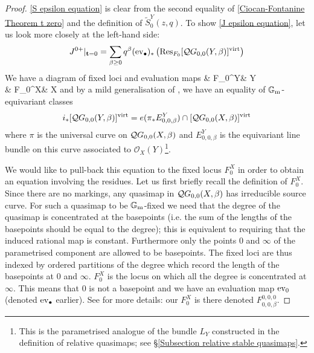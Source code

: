 \begin{proof}
\eqref{S epsilon equation} is clear from the second equality of \eqref{Ciocan-Fontanine Theorem t zero} and the definition of $\tilde{S}^Y_0(z,q)$. To show  \eqref{J epsilon equation}, let us look more closely at the left-hand side:
\begin{equation*} {J^{0+}}|_{{\mathbf{t}=0}} = \sum_{\beta\geq 0}q^\beta(\operatorname{ev}_\bullet)_* \left( \operatorname{Res}_{F_0}[\mathcal{Q}G_{0,0}(Y,\beta)]^{\operatorname{virt}} \right) \end{equation*}
We have a diagram of fixed loci and evaluation maps
\bcd
{}\ar[d,hook,"i"] & F_0^Y\ar[d, hook, "i"]\ar[l,hook']\ar[r,"\ev_{\bullet}"] & Y\ar[d,hook,"i"] \\
 & F_0^X\ar[l,hook']\ar[r,"\ev_{\bullet}"] & X
\ecd
and by a mild generalisation of \cite[Propositions 6.2.2 and 6.2.3]{CFKM}, we have an equality of $\mathbb{G}_{\text{m}}$-equivariant classes
\begin{equation*} i_*[\mathcal{Q}G_{0,0}(Y,\beta)]^{\operatorname{virt}}=e(\pi_* E^Y_{0,0,\beta})\cap [\mathcal{Q}G_{0,0}(X,\beta)]^{\operatorname{virt}} \end{equation*} 
where $\pi$ is the universal curve on $\mathcal{Q}G_{0,0}(X,\beta)$ and $E^Y_{0,0,\beta}$ is the equivariant line bundle on this curve associated to $\mathcal O_X(Y)$\footnote{This is the parametrised analogue of the bundle $L_Y$ constructed in the definition of relative quasimaps; see \S \ref{Subsection relative stable quasimaps}.}.
 
We would like to pull-back this equation to the fixed locus $F_0^X$ in order to obtain an equation involving the residues. Let us first briefly recall the definition of $F_0^X$. Since there are no markings, any quasimap in $\mathcal{Q}G_{0,0}(X,\beta)$ has irreducible source curve. For such a quasimap to be $\mathbb{G}_{\text{m}}$-fixed we need that the degree of the quasimap is concentrated at the basepoints (i.e. the sum of the lengths of the basepoints should be equal to the degree); this is equivalent to requiring that the induced rational map is constant. Furthermore only the points $0$ and $\infty$ of the parametrised component are allowed to be basepoints. The fixed loci are thus indexed by ordered partitions of the degree which record the length of the basepoints at $0$ and $\infty$. $F_0^X$ is the locus on which all the degree is concentrated at $\infty$. This means that $0$ is not a basepoint and we have an evaluation map $\operatorname{ev}_0$ (denoted $\operatorname{ev}_{\bullet}$ earlier). See \cite[\S 4]{CF-K-wallcrossing} for more details: our $F_0^X$ is there denoted $F^{0,0,0}_{0,0,\beta}$.


\end{proof}
